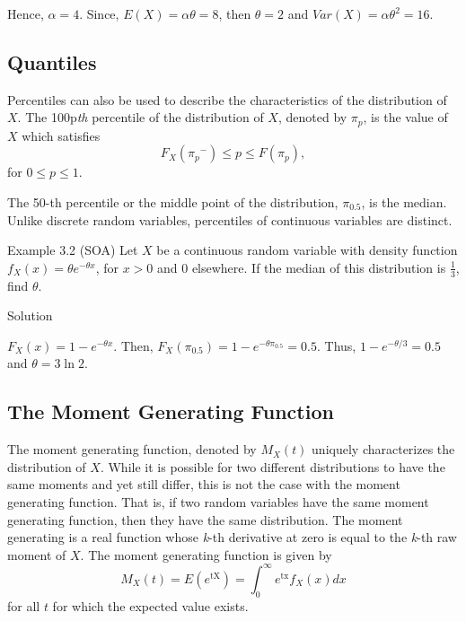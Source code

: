 \documentclass[]{book}
\theoremstyle{definition}
\theoremstyle{definition}
\theoremstyle{definition}
\theoremstyle{remark}
\begin{document}
Hence, \(\alpha = 4\). Since, \(E\left( X \right) = \alpha\theta = 8\),
then \(\theta = 2\) and \(Var\left( X \right) = \alpha\theta^{2} = 16\).

\subsection{Quantiles}\label{quantiles}

Percentiles can also be used to describe the characteristics of the
distribution of \(X\). The 100p\emph{th} percentile of the distribution
of \(X\), denoted by \(\pi_{p}\), is the value of \(X\) which satisfies
\[F_{X}\left( {\pi_{p}}^{-} \right) \leq p \leq F\left( \pi_{p} \right) ,\]
for \(0 \leq p \leq 1\).

The 50-th percentile or the middle point of the distribution,
\(\pi_{0.5}\), is the median. Unlike discrete random variables,
percentiles of continuous variables are distinct.

Example 3.2 (SOA) Let \(X\) be a continuous random variable with density
function \(f_{X}\left( x \right) = \theta e^{- \theta x}\), for
\(x > 0\) and 0 elsewhere. If the median of this distribution is
\(\frac{1}{3}\), find \(\theta\).

Solution

\(F_{X}\left( x \right) = 1 - e^{- \theta x}\). Then,
\(F_{X}\left( \pi_{0.5} \right) = 1 - e^{- \theta\pi_{0.5}} = 0.5\).
Thus, \(1 - e^{-\theta / 3} = 0.5\) and \(\theta = 3 \ln 2\).

\subsection{The Moment Generating
Function}\label{the-moment-generating-function}

The moment generating function, denoted by \(M_{X}\left( t \right)\)
uniquely characterizes the distribution of \(X\). While it is possible
for two different distributions to have the same moments and yet still
differ, this is not the case with the moment generating function. That
is, if two random variables have the same moment generating function,
then they have the same distribution. The moment generating is a real
function whose \emph{k}-th derivative at zero is equal to the
\emph{k}-th raw moment of \(X\). The moment generating function is given
by
\[M_{X}\left( t \right) = E\left( e^{\text{tX}} \right) = \int_{0}^{\infty}{e^{\text{tx}}f_{X}\left( x \right) dx }\]
for all \(t\) for which the expected value exists.
\end{document}
